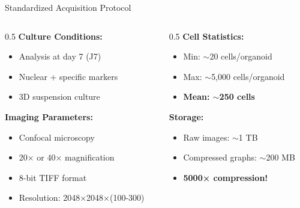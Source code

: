 \documentclass[aspectratio=169]{beamer}
\begin{document}
\begin{frame}{Standardized Acquisition Protocol}
    \begin{columns}
        \begin{column}{0.5\textwidth}
            \textbf{Culture Conditions:}
            \begin{itemize}
                \item Analysis at day 7 (J7)
                \item Nuclear + specific markers
                \item 3D suspension culture
            \end{itemize}
            
            \vspace{0.5em}
            \textbf{Imaging Parameters:}
            \begin{itemize}
                \item Confocal microscopy
                \item 20× or 40× magnification
                \item 8-bit TIFF format
                \item Resolution: 2048×2048×(100-300)
            \end{itemize}
        \end{column}
        \begin{column}{0.5\textwidth}
            \textbf{Cell Statistics:}
            \begin{itemize}
                \item Min: $\sim$20 cells/organoid
                \item Max: $\sim$5,000 cells/organoid
                \item \textbf{Mean: $\sim$250 cells}
            \end{itemize}
            
            \vspace{0.5em}
            \textbf{Storage:}
            \begin{itemize}
                \item Raw images: $\sim$1 TB
                \item Compressed graphs: $\sim$200 MB
                \item \textbf{5000× compression!}
            \end{itemize}
        \end{column}
    \end{columns}
\end{frame}
\end{document}
